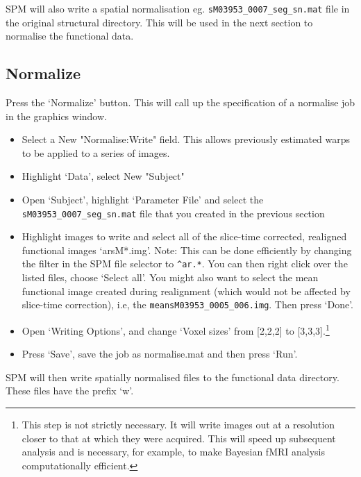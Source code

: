 \documentclass[a4paper,titlepage]{book}
\newcommand{\bi}{\begin{itemize}}
\newcommand{\ei}{\end{itemize}}
\begin{document}
SPM will also write a spatial normalisation eg. 
\verb!sM03953_0007_seg_sn.mat! file in the 
original structural directory. This will be used 
in the next section to normalise the functional data. 


\subsection{Normalize}

Press the `Normalize' button. This will call up the specification of a normalise job in the graphics 
window. 

\bi
\item{Select a New "Normalise:Write" field. This 
allows previously estimated warps to be applied to 
a series of images.}
\item{Highlight `Data', select New "Subject"}
\item{Open `Subject', highlight `Parameter File' and 
select the \verb!sM03953_0007_seg_sn.mat! file that you 
created in the previous section}
\item{Highlight images to write and select all of the 
slice-time corrected, realigned functional images `arsM*.img'. Note: This can be done efficiently by changing the filter in the SPM file selector to \verb!^ar.*!. You can then right click over the listed files, choose `Select all'. You might also want to select the mean functional image created during realignment (which would not be affected by slice-time correction), i.e, the \verb!meansM03953_0005_006.img!. Then press `Done'.}
\item{Open `Writing Options', and change `Voxel sizes' from [2,2,2] to [3,3,3].\footnote{This step is not 
strictly necessary. It will write images out at 
a resolution closer to that at which they were acquired. 
This will speed up subsequent analysis and is necessary, for example, to make Bayesian fMRI analysis computationally efficient.}}
\item{Press `Save', save the job as normalise.mat and then
press `Run'.}
\ei
SPM will then write spatially normalised files to the 
functional data directory. These files have the prefix `w'.
\end{document}
